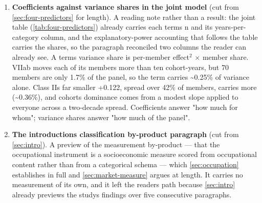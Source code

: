 \begin{enumerate}
  model). The uncharged (coded) instrument wins the registered AIC
  comparison narrowly (\(-205.0\) vs \(-198.6\)); encompassing tests are significant
  in both directions --- neither instrument subsumes the other. The registered
  four-sign component pattern (U+ L\(-\) D+ N+) holds in 25\% of pattern-eligible
  lattice specifications, permutation p = 0.087 across 2,000 within-chamber
  shuffles --- suggestive, unconfirmed. Under the covariate lattice, L\textquotesingle s raw
  positivity dissolves (median +0.012, direction-unstable): the
  external-service gradient was carrying class and education correlation
  rather than surviving it, while U and N stay right-signed in 100\% of
  specifications and D turns mildly positive throughout.
\item
  \textbf{Coefficients against variance shares in the joint model} (cut from
  \cref{sec:four-predictors} for length). A reading note rather than a result: the joint table (\cref{tab:four-predictors}) already carries each term\textquotesingle s n and its years-per-category column, and the
  explanatory-power accounting that follows the table carries the shares, so
  the paragraph reconciled two columns the reader can already see. A term\textquotesingle s
  variance share is per-member effect\({}^{2}\) \(\times\) member share. VIIab moves each of
  its members more than ten cohort-years, but 70 members are only 1.7\% of
  the panel, so the term carries \textasciitilde0.25\% of variance alone. Class II\textquotesingle s far
  smaller +0.122, spread over 42\% of members, carries more (\textasciitilde0.36\%), and
  cohort\textquotesingle s dominance comes from a modest slope applied to everyone across a
  two-decade spread. Coefficients answer "how much for whom"; variance
  shares answer "how much of the panel".
\item
  \textbf{The introduction\textquotesingle s classification by-product paragraph} (cut from \cref{sec:intro}).
  A preview of the measurement by-product --- that the occupational instrument
  is a socioeconomic measure scored from occupational content rather than
  from a categorical schema --- which \cref{sec:occupation} establishes in full and \cref{sec:market-measure} argues
  at length. It carries no measurement of its own, and it left the reader\textquotesingle s
  path because \cref{sec:intro} already previews the study\textquotesingle s findings over five consecutive
  paragraphs.


\end{enumerate}
